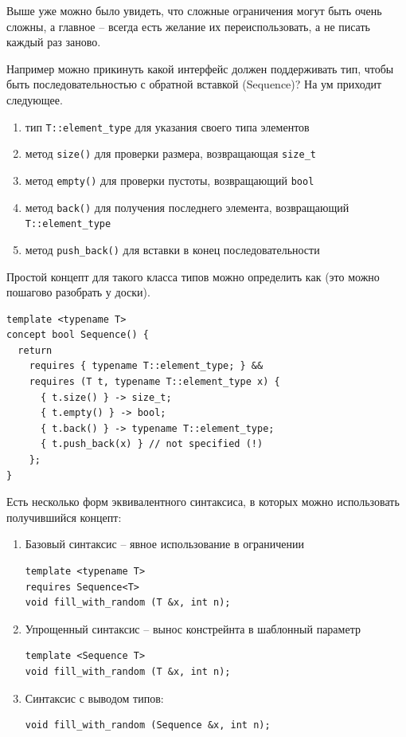 \documentclass[a4paper,12pt,oneside]{book}
\begin{document}
Выше уже можно было увидеть, что сложные ограничения могут быть очень сложны, а главное -- всегда есть желание их переиспользовать, а не писать каждый раз заново.

Например можно прикинуть какой интерфейс должен поддерживать тип, чтобы быть последовательностью с обратной вставкой (Sequence)? На ум приходит следующее.

\begin{enumerate}
\item тип \lstinline!T::element_type! для указания своего типа элементов
\item метод \lstinline!size()! для проверки размера, возвращающая \lstinline!size_t!
\item метод \lstinline!empty()! для проверки пустоты, возвращающий \lstinline!bool!
\item метод \lstinline!back()! для получения последнего элемента, возвращающий \lstinline!T::element_type!
\item метод \lstinline!push_back()! для вставки в конец последовательности
\end{enumerate}

Простой концепт для такого класса типов можно определить как (это можно пошагово разобрать у доски).

\begin{lstlisting}
template <typename T>
concept bool Sequence() {
  return
    requires { typename T::element_type; } &&
    requires (T t, typename T::element_type x) {
      { t.size() } -> size_t;
      { t.empty() } -> bool;
      { t.back() } -> typename T::element_type;
      { t.push_back(x) } // not specified (!)
    };
}
\end{lstlisting}

Есть несколько форм эквивалентного синтаксиса, в которых можно использовать получившийся концепт:

\begin{enumerate}

\item Базовый синтаксис -- явное использование в ограничении 
\begin{lstlisting}
template <typename T> 
requires Sequence<T>
void fill_with_random (T &x, int n);
\end{lstlisting}

\item Упрощенный синтаксис -- вынос констрейнта в шаблонный параметр

\begin{lstlisting}
template <Sequence T> 
void fill_with_random (T &x, int n);
\end{lstlisting}

\item Синтаксис с выводом типов:

\begin{lstlisting}
void fill_with_random (Sequence &x, int n);
\end{lstlisting}

\end{enumerate}
\end{document}
